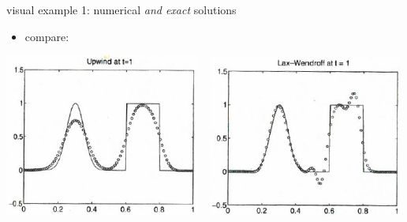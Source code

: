 \documentclass[10pt,hyperref]{beamer}
\begin{document}
\begin{frame}{visual example 1: numerical \emph{and exact} solutions}

\begin{itemize}
\item compare:
\end{itemize}

\bigskip
\hfill \mbox{\includegraphics[width=0.48\textwidth]{figs/leveque6p1upwind} \, \includegraphics[width=0.48\textwidth]{figs/leveque6p1lw}}
\end{frame}
\end{document}
